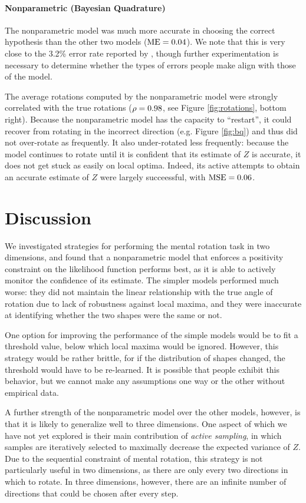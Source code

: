 \documentclass{article} %
\begin{document}
\paragraph{Nonparametric (Bayesian Quadrature)}

The nonparametric model was much more accurate in choosing the correct
hypothesis than the other two models ($\mathrm{ME}{}=0.04{}$). We note that this is
very close to the 3.2\% error rate reported by \cite{Shepard1971},
though further experimentation is necessary to determine whether the
types of errors people make align with those of the model.  

The average rotations computed by the nonparametric model were
strongly correlated with the true rotations ($\rho=0.98$, see Figure
\ref{fig:rotations}, bottom right). Because the nonparametric model
has the capacity to ``restart'', it could recover from rotating in the
incorrect direction (e.g. Figure \ref{fig:bq}) and thus did not
over-rotate as frequently.  It also under-rotated less frequently:
because the model continues to rotate until it is confident that its
estimate of $Z$ is accurate, it does not get stuck as easily on local
optima.  Indeed, its active attempts to obtain an accurate estimate of
$Z$ were largely succeessful, with $\mathrm{MSE}{}=0.06{}$.


\section{Discussion}

We investigated strategies for performing the mental rotation task
\cite{Shepard1971} in two dimensions, and found that a nonparametric
model that enforces a positivity constraint on the likelihood function
performs best, as it is able to actively monitor the confidence of its
estimate. The simpler models performed much worse: they did not
maintain the linear relationship with the true angle of rotation due
to lack of robustness against local maxima, and they were inaccurate
at identifying whether the two shapes were the same or not.

One option for improving the performance of the simple models would be
to fit a threshold value, below which local maxima would be
ignored. However, this strategy would be rather brittle, for if the
distribution of shapes changed, the threshold would have to be
re-learned. It is possible that people exhibit this behavior, but we
cannot make any assumptions one way or the other without empirical
data.

A further strength of the nonparametric model over the other models,
however, is that it is likely to generalize well to three
dimensions. One aspect of \cite{Osborne:2012tm} which we have not yet
explored is their main contribution of \textit{active sampling}, in
which samples are iteratively selected to maximally decrease the
expected variance of $Z$. Due to the sequential constraint of mental
rotation, this strategy is not particularly useful in two dimensions,
as there are only every two directions in which to rotate. In three
dimensions, however, there are an infinite number of directions that
could be chosen after every step.
\end{document}
